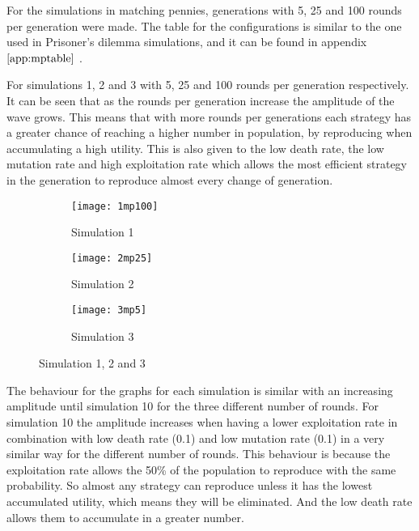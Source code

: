 For the simulations in matching pennies, generations with 5, 25 and 100 rounds per generation were made.  The table for the configurations is similar to the one used in Prisoner's dilemma simulations, and it can be found in appendix $\ref{app:mptable}$ .

For simulations 1, 2 and 3 with 5, 25 and 100 rounds per generation respectively. It can be seen that as the rounds per generation increase the amplitude of the wave grows. This means that with more rounds per generations each strategy has a greater chance of reaching a higher number in population, by reproducing when accumulating a high utility. This is also given to the low death rate, the low mutation rate and high exploitation rate which allows the most efficient strategy in the generation to reproduce almost every change of generation.

\begin{figure}[H]       
    \centering
    \begin{subfigure}[b]{0.3\textwidth}
	\centering
	{\texttt{[image: 1mp100]}}   
    	\caption{Simulation 1}
	\label{fig:mpsim1}
    \end{subfigure}
    \hfill
    \begin{subfigure}[b]{0.3\textwidth}
	\centering
	{\texttt{[image: 2mp25]}}   
    	\caption{Simulation 2}
	\label{fig:mpsim2}
    \end{subfigure}
    \hfill
    \begin{subfigure}[b]{0.3\textwidth}
	\centering
	{\texttt{[image: 3mp5]}}   
    	\caption{Simulation 3}
	\label{fig:mpsim3}
    \end{subfigure}
    \caption{Simulation 1, 2 and 3}
    \label{firstthreesimulations}
\end{figure}

The behaviour for the graphs for each simulation is similar with an increasing amplitude until simulation 10 for the three different number of rounds. For simulation 10 the amplitude increases when having a lower exploitation rate in combination with low death rate (0.1) and low mutation rate (0.1) in a very similar way for the different number of rounds. This behaviour is because the exploitation rate allows the 50\% of the population to reproduce with the same probability. So almost any strategy can reproduce unless it has the lowest accumulated utility, which means they will be eliminated. And the low death rate allows them to accumulate in a greater number.

